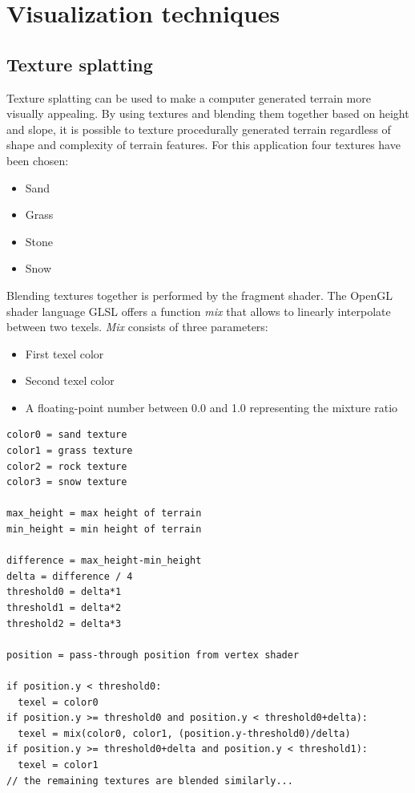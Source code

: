 \documentclass[11pt,a4paper,twoside,openright]{report}
\begin{document}
\section{Visualization techniques}
\subsection{Texture splatting}
Texture splatting can be used to make a computer generated terrain more visually appealing. By using textures and blending them together based on height and slope, it is possible to texture procedurally generated terrain regardless of shape and complexity of terrain features. For this application four textures have been chosen:
\begin{itemize}
\item Sand
\item Grass
\item Stone
\item Snow
\end{itemize}
Blending textures together is performed by the fragment shader. The OpenGL shader language GLSL offers a function \emph{mix} that allows to linearly interpolate between two texels. \emph{Mix} consists of three parameters:
\begin{itemize}
\item First texel color
\item Second texel color
\item A floating-point number between 0.0 and 1.0 representing the mixture ratio
\end{itemize}
\begin{lstlisting}[caption=Fragment shader texture chooser pseudocode]
color0 = sand texture
color1 = grass texture
color2 = rock texture
color3 = snow texture

max_height = max height of terrain
min_height = min height of terrain

difference = max_height-min_height
delta = difference / 4
threshold0 = delta*1
threshold1 = delta*2
threshold2 = delta*3

position = pass-through position from vertex shader

if position.y < threshold0:
  texel = color0
if position.y >= threshold0 and position.y < threshold0+delta):
  texel = mix(color0, color1, (position.y-threshold0)/delta)
if position.y >= threshold0+delta and position.y < threshold1):
  texel = color1
// the remaining textures are blended similarly...
\end{lstlisting}
\end{document}
